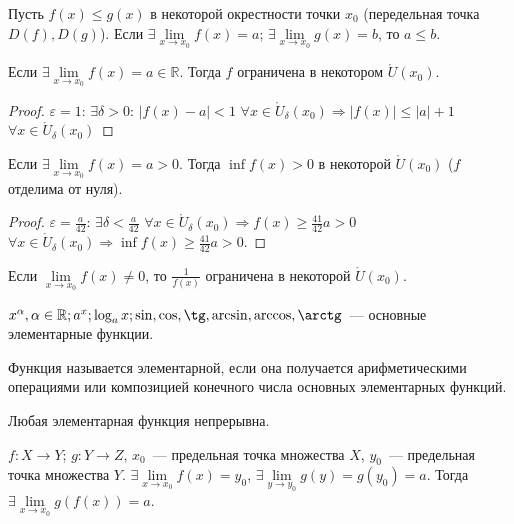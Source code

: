 \documentclass[12pt]{article}
\begin{document}
	\begin{lemma}
		Пусть $f(x) \leqslant g(x)$ в некоторой окрестности точки $x_0$ (передельная точка $D(f), D(g)$). Если $\exists \lim \limits_{x \rightarrow x_0} f(x) = a$; $\exists \lim \limits_{x \rightarrow x_0} g(x) = b$, то $a \leqslant b$.
	\end{lemma}
	\begin{lemma}[Об ограниченности]
		Если $\exists \lim \limits_{x \rightarrow x_0} f(x) = a \in \mathbb{R}$. Тогда $f$ ограничена в некотором $\mathring{U}(x_0)$.
	\end{lemma}
	\begin{proof}
		$\varepsilon = 1$: $\exists \delta > 0$: $|f(x) - a| < 1$ $\forall x \in \mathring{U}_{\delta}(x_0) \Rightarrow |f(x)| \leqslant |a| + 1$ $\forall x \in \mathring{U}_{\delta}(x_0)$
	\end{proof}
	\begin{lemma}
		Если $\exists \lim \limits_{x \rightarrow x_0} f(x) = a > 0$. Тогда $\inf f(x) > 0$ в некоторой $\mathring{U}(x_0)$ ($f$ отделима от нуля).
	\end{lemma}
	\begin{proof}
		$\varepsilon = \frac{a}{42}$: $\exists \delta < \frac{a}{42}$ $\forall x \in \mathring{U}_{\delta}(x_0) \Rightarrow f(x) \geqslant \frac{41}{42}a > 0$ $\forall x \in \mathring{U}_{\delta}(x_0) \Rightarrow \inf f(x) \geqslant \frac{41}{42}a > 0$.
	\end{proof}
	\begin{corollary}
		Если $\lim \limits_{x \rightarrow x_0} f(x) \not= 0$, то $\frac{1}{f(x)}$ ограничена в некоторой $\mathring{U}(x_0)$.
	\end{corollary}
	\begin{definition}
		$x^{\alpha}, \alpha \in \mathbb{R} ; a^x; \log_ax; \sin, \cos, \tg, \arcsin, \arccos, \arctg$~--- основные элементарные функции.
	\end{definition}
	\begin{definition}
		Функция называется элементарной, если она получается арифметическими операциями или композицией конечного числа основных элементарных функций.
	\end{definition}
	\begin{statement}
		Любая элементарная функция непрерывна.
	\end{statement}
	\begin{theorem}
		$f: X \rightarrow Y$; $g: Y \rightarrow Z$, $x_0$~--- предельная точка множества $X$, $y_0$~--- предельная точка множества $Y$. $\exists \lim \limits_{x \rightarrow x_0} f(x) = y_0$, $\exists \lim \limits_{y \rightarrow y_0} g(y) = g(y_0) = a$. Тогда $\exists \lim \limits_{x \rightarrow x_0} g(f(x)) = a$.
	\end{theorem}
\end{document}
